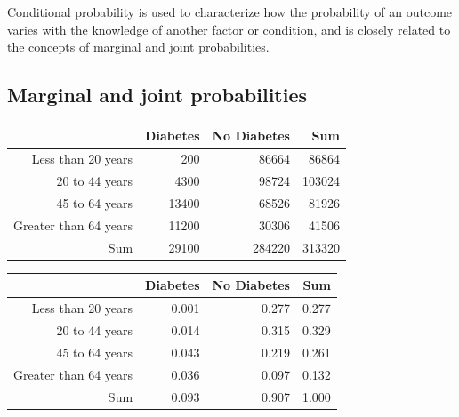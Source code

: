 Conditional probability is used to  characterize how the probability of an outcome varies with the knowledge of another factor or condition, and is closely related to the concepts of marginal and joint probabilities.






\subsection{Marginal and joint probabilities}
\label{marginalAndJointProbabilities}



\begin{table}[ht]
\centering
\begin{tabular}{rrrr}
  \hline
 & Diabetes & No Diabetes & Sum \\ 
  \hline
Less than 20 years & 200 & 86664 & 86864 \\ 
  20 to 44 years & 4300 & 98724 & 103024 \\ 
  45 to 64 years & 13400 & 68526 & 81926 \\ 
  Greater than 64 years & 11200 & 30306 & 41506 \\ 
  Sum & 29100 & 284220 & 313320 \\ 
   \hline
\end{tabular}
\end{table}


\begin{table}[ht]
\centering
\begin{tabular}{rrrr}
  \hline
 & Diabetes & No Diabetes & Sum \\ 
  \hline
Less than 20 years & 0.001 & 0.277 & 0.277 \\ 
  20 to 44 years & 0.014 & 0.315 & 0.329 \\ 
  45 to 64 years & 0.043 & 0.219 & 0.261 \\ 
  Greater than 64 years & 0.036 & 0.097 & 0.132 \\ 
  Sum & 0.093 & 0.907 & 1.000 \\ 
   \hline
\end{tabular}
\end{table}
















